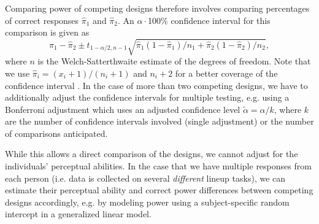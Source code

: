 Comparing power of competing designs therefore involves comparing percentages of correct responses $\widehat{\pi}_1$ and $\widehat{\pi}_2$. An $\alpha\cdot$100\% confidence interval for this comparison is given as 
\begin{equation}\label{eq:comp}
\widehat{\pi}_1 - \widehat{\pi}_2 \pm t_{1-\alpha/2, n-1} \sqrt{\widehat{\pi}_1(1-\widehat{\pi}_1)/n_1 + \widehat{\pi}_2(1-\widehat{\pi}_2)/n_2},
\end{equation}
where $n$ is the Welch-Satterthwaite \cite{welch:1947} estimate of the degrees of freedom. Note that we use $\widehat{\pi}_i = (x_i+1)/(n_i+1)$ and $n_i+2$ for a better coverage of the confidence interval \cite{agresti:1998}. In the case of more than two competing designs, we have to additionally adjust the confidence intervals for multiple testing, e.g. using a Bonferroni adjustment which uses an adjusted  confidence level $\tilde{\alpha} = \alpha/k$, where $k$ are the number of confidence intervals involved (single adjustment) or the number of comparisons anticipated.

While this allows a direct comparison of the designs, we cannot adjust for the individuals' perceptual abilities.
In the case that we have multiple responses from each person (i.e. data is collected on several {\it different} lineup tasks), we can estimate their perceptual ability and correct power differences between competing designs accordingly, e.g. by modeling power using  a subject-specific random intercept in a generalized linear model.







